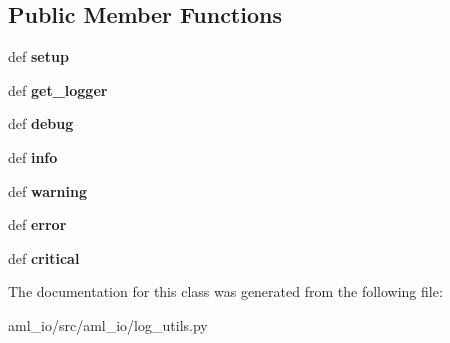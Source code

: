 \subsection*{Public Member Functions}
\begin{DoxyCompactItemize}
\item 
\hypertarget{classaml__io_1_1log__utils_1_1aml__logging_ad1c6883350754a0aec64aeee883c5f78}{def {\bfseries setup}}\label{classaml__io_1_1log__utils_1_1aml__logging_ad1c6883350754a0aec64aeee883c5f78}

\item 
\hypertarget{classaml__io_1_1log__utils_1_1aml__logging_ac22bb7f4c5aec1658be49d3d41f7ee3e}{def {\bfseries get\-\_\-logger}}\label{classaml__io_1_1log__utils_1_1aml__logging_ac22bb7f4c5aec1658be49d3d41f7ee3e}

\item 
\hypertarget{classaml__io_1_1log__utils_1_1aml__logging_a3d1c59219efd99ec1410eeb564a94fd8}{def {\bfseries debug}}\label{classaml__io_1_1log__utils_1_1aml__logging_a3d1c59219efd99ec1410eeb564a94fd8}

\item 
\hypertarget{classaml__io_1_1log__utils_1_1aml__logging_a7151cb8ed031a7393120bf542ca3ea43}{def {\bfseries info}}\label{classaml__io_1_1log__utils_1_1aml__logging_a7151cb8ed031a7393120bf542ca3ea43}

\item 
\hypertarget{classaml__io_1_1log__utils_1_1aml__logging_ab4d635f97a0ad5340b4986ad359fd73f}{def {\bfseries warning}}\label{classaml__io_1_1log__utils_1_1aml__logging_ab4d635f97a0ad5340b4986ad359fd73f}

\item 
\hypertarget{classaml__io_1_1log__utils_1_1aml__logging_ad0b4a07e0f166e346faecb9ff5e0627c}{def {\bfseries error}}\label{classaml__io_1_1log__utils_1_1aml__logging_ad0b4a07e0f166e346faecb9ff5e0627c}

\item 
\hypertarget{classaml__io_1_1log__utils_1_1aml__logging_a7220b4a7b5b8c7b09fdbea2ab9cfbcd1}{def {\bfseries critical}}\label{classaml__io_1_1log__utils_1_1aml__logging_a7220b4a7b5b8c7b09fdbea2ab9cfbcd1}

\end{DoxyCompactItemize}


The documentation for this class was generated from the following file\-:\begin{DoxyCompactItemize}
\item 
aml\-\_\-io/src/aml\-\_\-io/log\-\_\-utils.\-py\end{DoxyCompactItemize}
